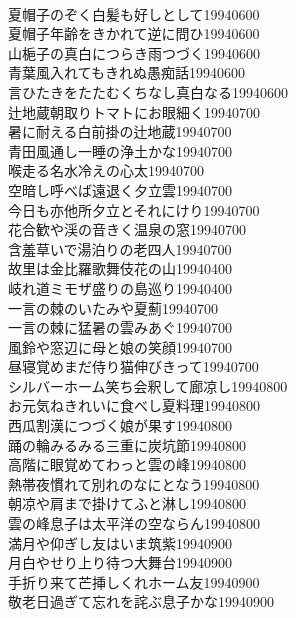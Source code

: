 \begin{multicols}{2}
\\夏帽子のぞく白髪も好しとして\hfill{19940600}
\\夏帽子年齢をきかれて逆に問ひ\hfill{19940600}
\\山梔子の真白につらき雨つづく\hfill{19940600}
\\青葉風入れてもきれぬ愚痴話\hfill{19940600}
\\言ひたきをたたむくちなし真白なる\hfill{19940600}
\\辻地蔵朝取りトマトにお眼細く\hfill{19940700}
\\暑に耐える白前掛の辻地蔵\hfill{19940700}
\\青田風通し一睡の浄土かな\hfill{19940700}
\\喉走る名水冷えの心太\hfill{19940700}
\\空暗し呼べば遠退く夕立雲\hfill{19940700}
\\今日も亦他所夕立とそれにけり\hfill{19940700}
\\花合歓や渓の音きく温泉の窓\hfill{19940700}
\\含羞草いで湯泊りの老四人\hfill{19940700}
\\故里は金比羅歌舞伎花の山\hfill{19940400}
\\岐れ道ミモザ盛りの島巡り\hfill{19940400}
\\一言の棘のいたみや夏薊\hfill{19940700}
\\一言の棘に猛暑の雲みあぐ\hfill{19940700}
\\風鈴や窓辺に母と娘の笑顔\hfill{19940700}
\\昼寝覚めまだ侍り猫伸びきって\hfill{19940700}
\\シルバーホーム笑ち会釈して廊凉し\hfill{19940800}
\\お元気ねきれいに食べし夏料理\hfill{19940800}
\\西瓜割漢につづく娘が果す\hfill{19940800}
\\踊の輪みるみる三重に炭坑節\hfill{19940800}
\\高階に眼覚めてわっと雲の峰\hfill{19940800}
\\熱帯夜慣れて別れのなにとなう\hfill{19940800}
\\朝凉や肩まで掛けてふと淋し\hfill{19940800}
\\雲の峰息子は太平洋の空ならん\hfill{19940800}
\\満月や仰ぎし友はいま筑紫\hfill{19940900}
\\月白やせり上り待つ大舞台\hfill{19940900}
\\手折り来て芒挿しくれホーム友\hfill{19940900}
\\敬老日過ぎて忘れを詫ぶ息子かな\hfill{19940900}

\end{multicols}
